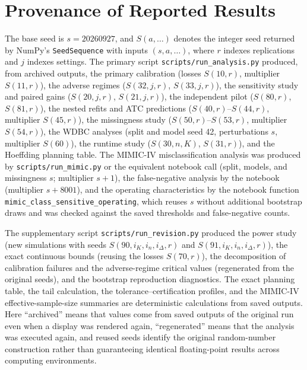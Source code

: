 \documentclass[twoside,11pt]{article}
\begin{document}
\section{Provenance of Reported Results}
\label{app:provenance}
The base seed is $s=20260927$, and $S(a,\ldots)$ denotes the integer seed returned by NumPy's
\texttt{SeedSequence} with inputs $(s,a,\ldots)$, where $r$ indexes replications and $j$
indexes settings. The primary script \texttt{scripts/run\_analysis.py} produced, from archived
outputs, the primary calibration (losses $S(10,r)$, multiplier $S(11,r)$), the adverse regimes
($S(32,j,r)$, $S(33,j,r)$), the sensitivity study and paired gains ($S(20,j,r)$, $S(21,j,r)$),
the independent pilot ($S(80,r)$, $S(81,r)$), the nested refits and ATC predictions
($S(40,r)$--$S(44,r)$, multiplier $S(45,r)$), the missingness study ($S(50,r)$--$S(53,r)$,
multiplier $S(54,r)$), the WDBC analyses (split and model seed 42, perturbations $s$,
multiplier $S(60)$), the runtime study ($S(30,n,K)$, $S(31,r)$), and the Hoeffding planning
table. The MIMIC-IV misclassification analysis was produced by \texttt{scripts/run\_mimic.py}
or the equivalent notebook call (split, models, and missingness $s$; multiplier $s+1$), the
false-negative analysis by the notebook (multiplier $s+8001$), and the operating
characteristics by the notebook function \texttt{mimic\_class\_sensitive\_operating}, which
reuses $s$ without additional bootstrap draws and was checked against the saved thresholds and
false-negative counts.

The supplementary script \texttt{scripts/run\_revision.py} produced the power study (new
simulations with seeds $S(90,i_K,i_n,i_\Delta,r)$ and $S(91,i_K,i_n,i_\Delta,r)$), the exact
continuous bounds (reusing the losses $S(70,r)$), the decomposition of calibration failures and
the adverse-regime critical values (regenerated from the original seeds), and the bootstrap
reproduction diagnostics. The exact planning table, the tail calculation, the
tolerance--certification profiles, and the MIMIC-IV effective-sample-size summaries are
deterministic calculations from saved outputs. Here ``archived'' means that values come from
saved outputs of the original run even when a display was rendered again, ``regenerated''
means that the analysis was executed again, and reused seeds identify the original
random-number construction rather than guaranteeing identical floating-point results across
computing environments.
\end{document}

